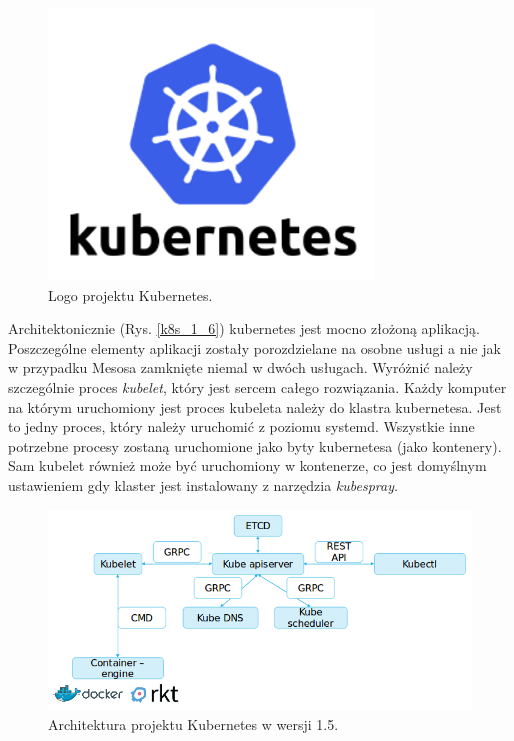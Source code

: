 \documentclass[10pt,a4paper,titlepage,twoside]{report}
\begin{document}
\begin{figure}[!h]
	\centering
	\includegraphics[scale=1]{pics/Kubernetes-logo.png}
	\caption{Logo projektu Kubernetes.}
	\label{kube_logo}
\end{figure}

Architektonicznie \cite{ad36}(Rys. \ref{k8s_1_6}) kubernetes jest mocno złożoną aplikacją. Poszczególne elementy aplikacji zostały porozdzielane na osobne usługi a nie jak w przypadku Mesosa zamknięte niemal w dwóch usługach. Wyróżnić należy szczególnie proces \textit{kubelet}, który jest sercem całego rozwiązania. Każdy komputer na którym uruchomiony jest proces kubeleta należy do klastra kubernetesa. Jest to jedny proces, który należy uruchomić z poziomu systemd. Wszystkie inne potrzebne procesy zostaną uruchomione jako byty kubernetesa (jako kontenery). Sam kubelet również może być uruchomiony w kontenerze, co jest domyślnym ustawieniem gdy klaster jest instalowany z narzędzia \textit{kubespray}. 

\begin{figure}[!h]
	\centering
	\includegraphics[scale=0.7]{pics/k8s_1_5.png}
	\caption{Architektura projektu Kubernetes w wersji 1.5.}
	\label{k8s_1_5}
\end{figure}
\end{document}
